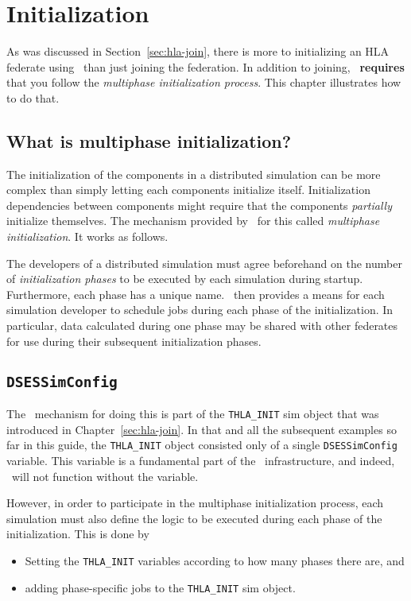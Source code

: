 \chapter{Initialization}
\label{sec:hla-init}

As was discussed in Section~\ref{sec:hla-join},
there is more to initializing an HLA federate using
\TrickHLA\ than just joining the federation.
In addition to joining,
\TrickHLA\ {\bf requires} that you follow the
{\em multiphase initialization process}.
This chapter illustrates how to do that.

\section{What is multiphase initialization?}

The initialization of the components in a distributed simulation can be
more complex than simply letting each components initialize itself.
Initialization dependencies between components might require that the
components {\em partially} initialize themselves.
The mechanism provided by \TrickHLA\ for this called {\em multiphase
initialization}.
It works as follows.

The developers of a distributed simulation must agree beforehand
on the number of {\em initialization phases} to be executed by each
simulation during startup.
Furthermore, each phase has a unique name.
\TrickHLA\ then provides a means for each simulation developer to
schedule jobs during each phase of the initialization.
In particular, data calculated during one phase may be shared with
other federates for use during their subsequent initialization phases.

\section{\tt DSESSimConfig}

The \TrickHLA\ mechanism for doing this is part of the {\tt THLA\_INIT}
sim object that was introduced in Chapter~\ref{sec:hla-join}.
In that and all the subsequent examples so far in this guide,
the {\tt THLA\_INIT} object consisted only of a single
{\tt DSESSimConfig} variable.
This variable is a fundamental part of the \TrickHLA\ infrastructure,
and indeed, \TrickHLA\ will not function without the variable.

However, in order to participate in the multiphase initialization process,
each simulation must also define the logic to be executed during each
phase of the initialization.
This is done by
\begin{itemize}
\item{
  Setting the {\tt THLA\_INIT} variables according to how many
  phases there are, and
}
\item{
  adding phase-specific jobs to the {\tt THLA\_INIT} sim object.
}
\end{itemize}

